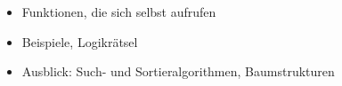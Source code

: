 \begin{frame}
    \begin{itemize}
        \item Funktionen, die sich selbst aufrufen
        \item Beispiele, Logikrätsel
        \item Ausblick: Such- und Sortieralgorithmen, Baumstrukturen
    \end{itemize}
\end{frame}